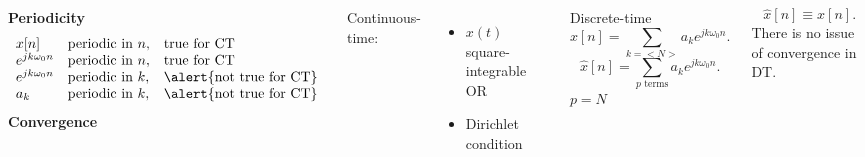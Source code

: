 \begin{frame}


    {
        \begin{columns}
            \textbf{Periodicity}
                \begin{equation*}
                    \begin{array}{lll}
                        x[n] & \text{periodic in } n, & \text{true for CT}\\
                        e^{jk\omega_0 n} & \text{periodic in } n, &\text{true for CT}\\
                        e^{jk\omega_0 n} & \text{periodic in } k, &\text{\alert{not true for CT}}\\
                        a_k &  \text{periodic in } k, &\text{\alert{not true for CT}}
                    \end{array}
                \end{equation*}
            \textbf{Convergence}\par
            Continuous-time:
            \begin{itemize}
                \item $x(t)$ square-integrable OR
                \item Dirichlet condition
            \end{itemize}
            Discrete-time
            \begin{equation*}
                x[n] = \sum_{k=<N>} a_k e^{jk\omega_0 n}.
            \end{equation*}
            \begin{equation*}
                \hat{x}[n] = \sum_{p \text{ terms}} a_k e^{jk\omega_0 n}.
            \end{equation*}
            $p = N$\par
            \begin{equation*}
                \hat{x}[n] \equiv x[n].
            \end{equation*}
            There is no issue of convergence in DT.
        \end{columns}
    }
\end{frame}

